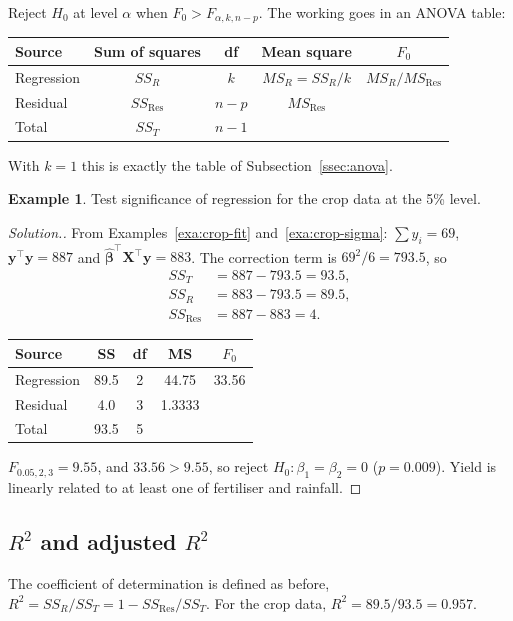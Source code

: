 \documentclass[11pt,a4paper]{article}
\numberwithin{equation}{section}
\theoremstyle{definition}
\newtheorem{exa}[thm]{Example}
\newenvironment{solution}
  {\renewcommand{\qedsymbol}{}\begin{proof}[\textit{Solution}.]}
  {\end{proof}}
\begin{document}
Reject $H_0$ at level $\alpha$ when $F_0 > F_{\alpha, k, n-p}$. The working goes in an
ANOVA table:
\begin{center}
\begin{tabular}{lcccc}
\hline
Source & Sum of squares & df & Mean square & $F_0$ \\
\hline
Regression & $SS_R$ & $k$ & $MS_R = SS_R/k$ & $MS_R/MS_{\mathrm{Res}}$ \\
Residual & $SS_{\mathrm{Res}}$ & $n - p$ & $MS_{\mathrm{Res}}$ & \\
\hline
Total & $SS_T$ & $n - 1$ & & \\
\hline
\end{tabular}
\end{center}
With $k = 1$ this is exactly the table of Subsection~\ref{ssec:anova}.

\begin{exa}\label{exa:crop-anova}
Test significance of regression for the crop data at the 5\% level.
\end{exa}

\begin{solution}
From Examples~\ref{exa:crop-fit} and~\ref{exa:crop-sigma}: $\sum y_i = 69$,
$\mathbf{y}^\top\mathbf{y} = 887$ and $\hat{\boldsymbol\beta}^\top\mathbf{X}^\top\mathbf{y} = 883$.
The correction term is $69^2/6 = 793.5$, so
\begin{align*}
SS_T &= 887 - 793.5 = 93.5, \\
SS_R &= 883 - 793.5 = 89.5, \\
SS_{\mathrm{Res}} &= 887 - 883 = 4 .
\end{align*}
\begin{center}
\begin{tabular}{lcccc}
\hline
Source & SS & df & MS & $F_0$ \\
\hline
Regression & 89.5 & 2 & 44.75 & 33.56 \\
Residual & 4.0 & 3 & 1.3333 & \\
\hline
Total & 93.5 & 5 & & \\
\hline
\end{tabular}
\end{center}
$F_{0.05,2,3} = 9.55$, and $33.56 > 9.55$, so reject $H_0\colon \beta_1 = \beta_2 = 0$
($p = 0.009$). Yield is linearly related to at least one of fertiliser and rainfall.
\end{solution}

\subsection{$R^2$ and adjusted $R^2$}
The coefficient of determination is defined as before, $R^2 = SS_R/SS_T = 1 - SS_{\mathrm{Res}}/SS_T$.
For the crop data, $R^2 = 89.5/93.5 = 0.957$.
\end{document}
